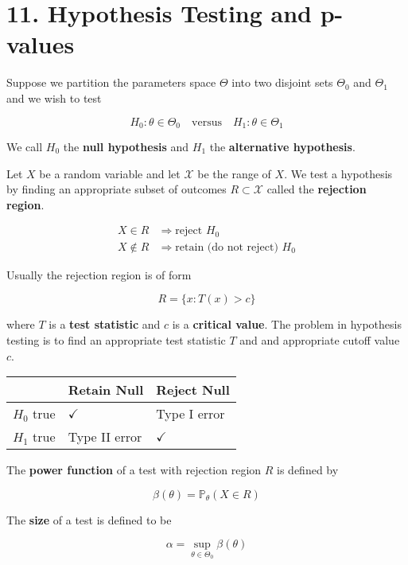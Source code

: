 \section*{11. Hypothesis Testing and p-values}\label{hypothesis-testing-and-p-values}

Suppose we partition the parameters space \(\Theta\) into two disjoint
sets \(\Theta_{0}\) and \(\Theta_{1}\) and we wish to test

\[
H_{0}: \theta \in \Theta_{0}
\quad \text{versus} \quad
H_{1}: \theta \in \Theta_{1}
\]

We call \(H_{0}\) the \textbf{null hypothesis} and \(H_{1}\) the
\textbf{alternative hypothesis}.

Let \(X\) be a random variable and let \(\mathcal{X}\) be the range of
\(X\). We test a hypothesis by finding an appropriate subset of outcomes
\(R \subset \mathcal{X}\) called the \textbf{rejection region}.

\begin{align*}
X \in R & \Longrightarrow  \text{reject } H_{0} \\
X \notin R & \Longrightarrow  \text{retain (do not reject) } H_{0}
\end{align*}

Usually the rejection region is of form

\[ R = \bigg\{x: T(x) > c \bigg\}\]

where \(T\) is a \textbf{test statistic} and \(c\) is a \textbf{critical
value}. The problem in hypothesis testing is to find an appropriate test
statistic \(T\) and and appropriate cutoff value \(c\).

\begin{table}[H]
\centering
\begin{tabular}{@{}lll@{}}
\toprule
& Retain Null & Reject Null \\
\midrule
\(H_{0}\) true & \(\checkmark\) & Type I error 
\\
\(H_{1}\) true & Type II error & \(\checkmark\) 
\\
\bottomrule
\end{tabular}
\end{table}

The \textbf{power function} of a test with rejection region \(R\) is
defined by

\[\beta(\theta) = \mathbb{P}_\theta(X \in R)\]

The \textbf{size} of a test is defined to be

\[\alpha = \sup_{\theta \in \Theta_{0}} \beta(\theta)\]

